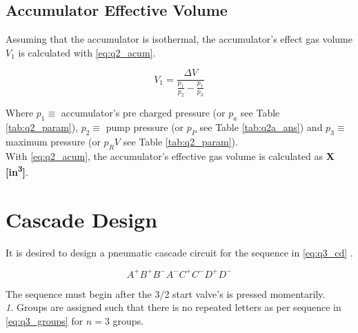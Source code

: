%
%
%
%


\section{Accumulator Effective Volume}

Assuming that the accumulator is isothermal, the accumulator's effect gas volume $V_1$ is calculated with \ref{eq:q2_acum}.

\begin{equation}
	\label{eq:q2_acum}
	V_1 = \frac{\Delta V}{\frac{p_1}{p_2}-\frac{p_1}{p_3}}
\end{equation}

Where $p_1 \equiv$ accumulator's pre charged pressure (or $p_a$ see Table \ref{tab:q2_param}), $p_2 \equiv$ pump pressure (or $p_P$ see Table \ref{tab:q2a_ans}) and $p_3 \equiv$ maximum pressure (or $p_RV$ see Table \ref{tab:q2_param}).\\

With \ref{eq:q2_acum}, the accumulator's effective gas volume is calculated as \textbf{X [in\textsuperscript{3}]}.

\chapter{Cascade Design}
\label{chap:q3}

It is desired to design a pneumatic cascade circuit for the sequence in \ref{eq:q3_cd} \cite{assign}.

\begin{equation}
	\label{eq:q3_cd}
	 A^+ B^+ B^- A^- C^+ C^- D^+ D^- 	
\end{equation}

The sequence must begin after the 3/2 start valve's is pressed momentarily.\\

\textit{1.} Groups are assigned such that there is no repeated letters as per sequence in \ref{eq:q3_groups} for $n=3$ groups.

